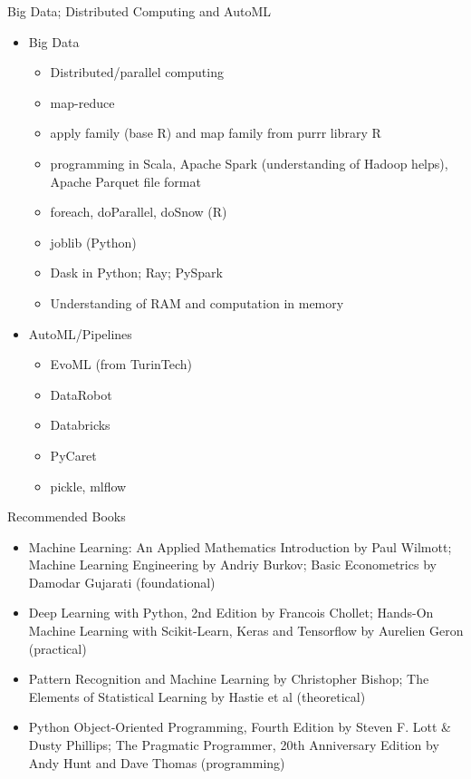 \documentclass[compress,brown]{beamer}
\begin{document}
\begin{frame}{Big Data; Distributed Computing and AutoML}
\begin{itemize}
	\item Big Data
	\begin{itemize}
		\item Distributed/parallel computing
		\item map-reduce
		\item apply family (base R) and map family from purrr library R
		\item programming in Scala, Apache Spark (understanding of Hadoop helps), Apache Parquet file format
		\item foreach, doParallel, doSnow (R)
		\item joblib (Python)
		\item Dask in Python; Ray; PySpark
		\item Understanding of RAM and computation in memory
	\end{itemize}
	\item AutoML/Pipelines
		\begin{itemize}
			\item EvoML (from TurinTech)
			\item DataRobot
			\item Databricks
			\item PyCaret
			\item pickle, mlflow
		\end{itemize}
\end{itemize}
\end{frame}

\begin{frame}{Recommended Books}
\begin{itemize}
	\item Machine Learning: An Applied Mathematics Introduction by Paul Wilmott; Machine Learning Engineering by Andriy Burkov; Basic Econometrics by Damodar Gujarati (foundational)
	\item Deep Learning with Python, 2nd Edition by Francois Chollet; Hands-On Machine Learning with Scikit-Learn, Keras and Tensorflow by Aurelien Geron (practical)
	\item Pattern Recognition and Machine Learning by Christopher Bishop; The Elements of Statistical Learning by Hastie et al (theoretical)
	\item Python Object-Oriented Programming, Fourth Edition by Steven F. Lott \& Dusty Phillips; The Pragmatic Programmer, 20th Anniversary Edition by Andy Hunt and Dave Thomas (programming)
\end{itemize}
\end{frame}
\end{document}
